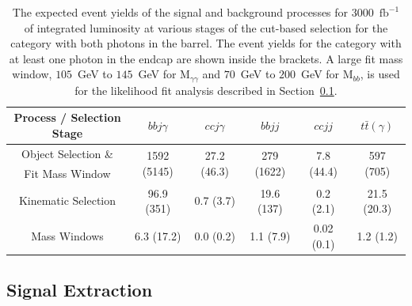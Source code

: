 \begin{table}[!ht]
\begin{center}
\vspace{2mm}

\begin{tabular}{|c|c|c|c|c|c|}
\hline
Process / Selection Stage           &  $bb j\gamma$                  &  $ccj\gamma$                  & $bb jj$                    &  $ccjj$                       & $t\bar{t}(\gamma)$                \\  \hline
Object Selection \&                 &  \multirow{2}{*}{1592 (5145)}   &  \multirow{2}{*}{27.2 (46.3)}   & \multirow{2}{*}{279 (1622)} &  \multirow{2}{*}{7.8 (44.4)}  &  \multirow{2}{*}{597 (705)} \\ 
Fit Mass Window                     &                                &                               &                            &                               &                           \\ 
Kinematic Selection                 &  96.9  (351)                     &  0.7  (3.7)                   & 19.6 (137)                   &  0.2 (2.1)                    &  21.5 (20.3)                \\ 
Mass Windows                        &  6.3 (17.2)                     &  0.0  (0.2)                   & 1.1 (7.9)                 &  0.02 (0.1)                   &  1.2 (1.2)                \\  \hline
\end{tabular}
\caption{ The expected event yields of the signal and background processes
for $3000$~$\mathrm{fb}^{-1}$ of integrated luminosity at various stages of the cut-based selection for 
the category with both photons in the barrel. The event yields for the category with at least one photon in the endcap are shown inside the brackets. A large fit mass
window, $105$~GeV to $145$~GeV for $\mathrm{M}_{\gamma\gamma}$ and $70$~GeV to $200$~GeV for $\mathrm{M}_{bb}$,
is used for the likelihood fit analysis described in Section~\ref{sec:signalextraction}. }
\label{tab:EventYields}
\end{center}
\end{table}


\subsection{Signal Extraction}
\label{sec:signalextraction}

